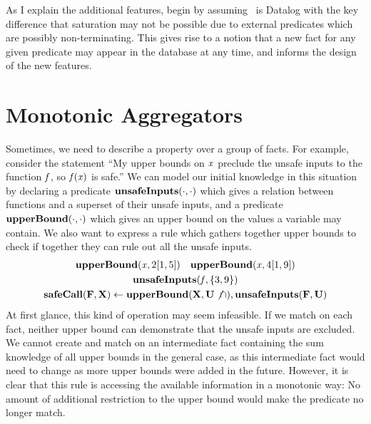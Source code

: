 As I explain the additional features, begin by assuming \sysname\ is Datalog with the key difference that saturation may not be possible due to external predicates which are possibly non-terminating.
This gives rise to a notion that a new fact for any given predicate may appear in the database at any time, and informs the design of the new features.

\section{Monotonic Aggregators}
\label{sec:monagg}
Sometimes, we need to describe a property over a group of facts.
For example, consider the statement ``My upper bounds on ${\it x}$ preclude the unsafe inputs to the function ${\it f}$, so ${\it f}({\it x})$ is safe.''
We can model our initial knowledge in this situation by declaring a predicate ${\bf unsafeInputs}(\cdot, \cdot)$ which gives a relation between functions and a superset of their unsafe inputs, and a predicate ${\bf upperBound}(\cdot, \cdot)$ which gives an upper bound on the values a variable may contain.
We also want to express a rule which gathers together upper bounds to check if together they can rule out all the unsafe inputs.
\begin{gather*}
        {\bf upperBound}({\it x}, 2[1, 5]) \quad {\bf upperBound}({\it x}, 4[1, 9])\\
        {\bf unsafeInputs}({\it f}, \{3, 9\})\\
        {\bf safeCall}({\bf F}, {\bf X}) \leftarrow {\bf upperBound}({\bf X}, {\bf U} \not \cap), {\bf unsafeInputs}({\bf F}, {\bf U})
\end{gather*}
At first glance, this kind of operation may seem infeasible.
If we match on each fact, neither upper bound can demonstrate that the unsafe inputs are excluded.
We cannot create and match on an intermediate fact containing the sum knowledge of all upper bounds in the general case, as this intermediate fact would need to change as more upper bounds were added in the future.
However, it is clear that this rule is accessing the available information in a monotonic way: No amount of additional restriction to the upper bound would make the predicate no longer match.

